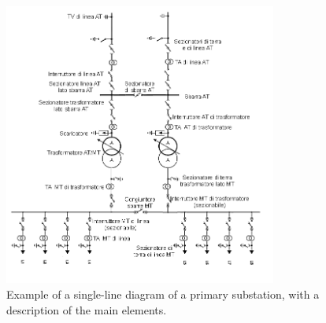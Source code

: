 \begin{figure}[t]
    \centering
    \includegraphics[width=0.8\textwidth]{chapters/figures/Schema_Unifilare_Cabina_Primaria.png}
    \caption{Example of a single-line diagram of a primary substation, with a description of the main elements.}
    \label{fig:schema-primary-substation}
\end{figure}


